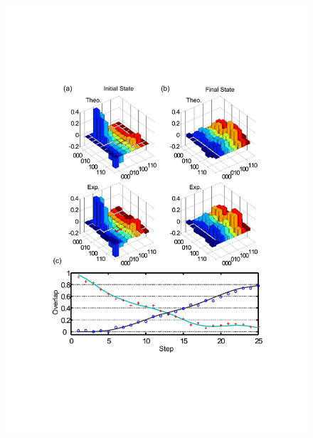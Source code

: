 \documentclass[twocolumn,showpacs,twoside,10pt,prl]{revtex4}
\begin{document}

\begin{figure}[htb]
\begin{center}
\includegraphics[width= 1\columnwidth]{tomo.pdf}
\end{center}

\end{figure}
\end{document}
